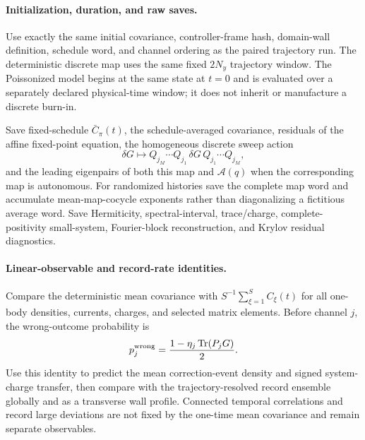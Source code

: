 \documentclass[aps,prx,twocolumn,floatfix,nofootinbib,superscriptaddress,longbibliography]{revtex4-2}
\newcommand{\qTr}{\operatorname{Tr}}
\begin{document}
\paragraph*{Initialization, duration, and raw saves.}
Use exactly the same initial covariance, controller-frame hash, domain-wall definition,
schedule word, and channel ordering as the paired trajectory run.  The deterministic
discrete map uses the same fixed $2N_y$ trajectory window.  The Poissonized model begins at
the same state at $t=0$ and is evaluated over a separately declared physical-time window;
it does not inherit or manufacture a discrete burn-in.

Save fixed-schedule $\bar C_\pi(t)$, the schedule-averaged covariance, residuals of the
affine fixed-point equation, the homogeneous discrete sweep action
\begin{equation}
 \delta G\longmapsto
 Q_{j_M}\cdots Q_{j_1}\,\delta G\,
 Q_{j_1}\cdots Q_{j_M},
 \label{eq:mean-sweep-homogeneous}
\end{equation}
and the leading eigenpairs of both this map and $\mathcal A(q)$ when the corresponding map
is autonomous.  For randomized histories save the complete map word and accumulate
mean-map-cocycle exponents rather than diagonalizing a fictitious average word.  Save Hermiticity,
spectral-interval, trace/charge, complete-positivity small-system, Fourier-block
reconstruction, and Krylov residual diagnostics.

\paragraph*{Linear-observable and record-rate identities.}
Compare the deterministic mean covariance with
$S^{-1}\sum_{\xi=1}^S C_\xi(t)$ for all one-body densities, currents, charges, and selected
matrix elements.  Before channel $j$, the wrong-outcome probability is
\begin{equation}
 p_j^{\rm wrong}
 =\frac{1-\eta_j\qTr(P_jG)}{2}.
 \label{eq:mean-wrong-probability}
\end{equation}
Use this identity to predict the mean correction-event density and signed system-charge
transfer, then compare with the trajectory-resolved record ensemble globally and as a transverse wall profile.
Connected temporal correlations and record large deviations are not fixed by the
one-time mean covariance and remain separate observables.
\end{document}
